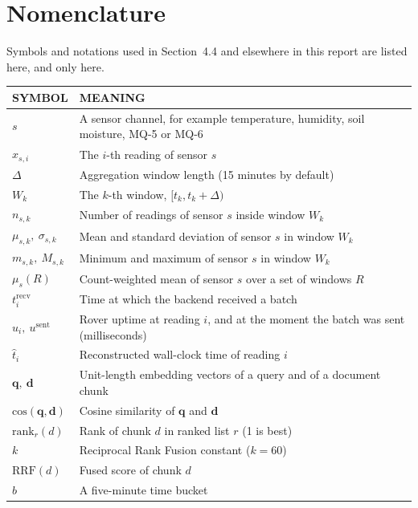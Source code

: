 \clearpage
\chapter*{Nomenclature}
Symbols and notations used in Section~4.4 and elsewhere in this report are listed here, and only here.

\begin{singlespace}
\setlength{\parskip}{0pt}
\small
\begin{longtable}{|P{2.6cm}|P{10.8cm}|}
\hline
\textbf{SYMBOL} & \textbf{MEANING}\\\hline\endhead
$s$ & A sensor channel, for example temperature, humidity, soil moisture, MQ-5 or MQ-6\\\hline
$x_{s,i}$ & The $i$-th reading of sensor $s$\\\hline
$\Delta$ & Aggregation window length (15 minutes by default)\\\hline
$W_k$ & The $k$-th window, $[t_k, t_k+\Delta)$\\\hline
$n_{s,k}$ & Number of readings of sensor $s$ inside window $W_k$\\\hline
$\mu_{s,k},\ \sigma_{s,k}$ & Mean and standard deviation of sensor $s$ in window $W_k$\\\hline
$m_{s,k},\ M_{s,k}$ & Minimum and maximum of sensor $s$ in window $W_k$\\\hline
$\mu_s(R)$ & Count-weighted mean of sensor $s$ over a set of windows $R$\\\hline
$t_i^{\mathrm{recv}}$ & Time at which the backend received a batch\\\hline
$u_i,\ u^{\mathrm{sent}}$ & Rover uptime at reading $i$, and at the moment the batch was sent (milliseconds)\\\hline
$\hat t_i$ & Reconstructed wall-clock time of reading $i$\\\hline
$\mathbf{q},\ \mathbf{d}$ & Unit-length embedding vectors of a query and of a document chunk\\\hline
$\mathrm{cos}(\mathbf{q},\mathbf{d})$ & Cosine similarity of $\mathbf{q}$ and $\mathbf{d}$\\\hline
$\mathrm{rank}_r(d)$ & Rank of chunk $d$ in ranked list $r$ (1 is best)\\\hline
$k$ & Reciprocal Rank Fusion constant ($k=60$)\\\hline
$\mathrm{RRF}(d)$ & Fused score of chunk $d$\\\hline
$b$ & A five-minute time bucket\\\hline

\end{longtable}
\end{singlespace}
